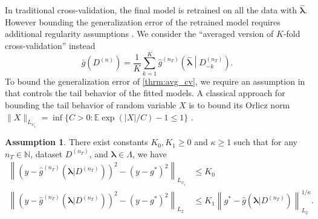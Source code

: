 \documentclass[12pt]{article} %
\theoremstyle{definition}
\newtheorem{assump}{Assumption}
\begin{document}
In traditional cross-validation, the final model is retrained on all the data with $\hat{\boldsymbol{\lambda}}$. However bounding the generalization error of the retrained model requires additional regularity assumptions \citep{lecue2012oracle}. We consider the ``averaged version of $K$-fold cross-validation'' instead
\begin{equation}
\label{thrm:avg_cv}
\bar{g}\left ( {D^{(n)}} \right ) = 
\frac{1}{K} \sum_{k=1}^K 
\hat{g}^{(n_T)} \left (\hat{\boldsymbol \lambda} \middle | D^{(n_T)}_{-k} \right ).
\end{equation}
To bound the generalization error of \eqref{thrm:avg_cv}, we require an assumption in \citet{lecue2012oracle} that controls the tail behavior of the fitted models.
A classical approach for bounding the tail behavior of random variable $X$ is to bound its Orlicz norm 
$\|X\|_{L_{\psi_1}}= \inf \{C > 0: \mathbb{E}\exp(|X|/C) - 1 \le 1\}$ \citep{van1996weak}.
\begin{assump}
	\label{assump:tail_margin}
	There exist constants $K_0, K_1 \ge 0$ and $\kappa \ge 1$ such that for any $n_T \in \mathbb{N}$, dataset $D^{(n_T)}$, and $\boldsymbol{\lambda} \in \Lambda$, we have
	\begin{align}
	\left \|
	\left(
	y - \hat{g}^{(n_T)}(\boldsymbol{\lambda} | D^{(n_T)})
	\right)^2
	- \left(
	y - g^*
	\right)^2
	\right \|_{L_{\psi_1}} & \le K_0
	\label{eq:cv_assump1}\\
	\left \|
	\left(
	y - \hat{g}^{(n_T)}(\boldsymbol{\lambda} | D^{(n_T)})
	\right)^2
	- \left(
	y - g^*
	\right)^2
	\right \|_{L_2}
	& \le 
	K_1 \left \|
	g^{*}-\hat{g}(\boldsymbol{\lambda}|D^{(n_{T})})
	\right \|_{L_{2}}^{1/\kappa}.
	\label{eq:cv_assump2}
	\end{align}
\end{assump}
\end{document}
